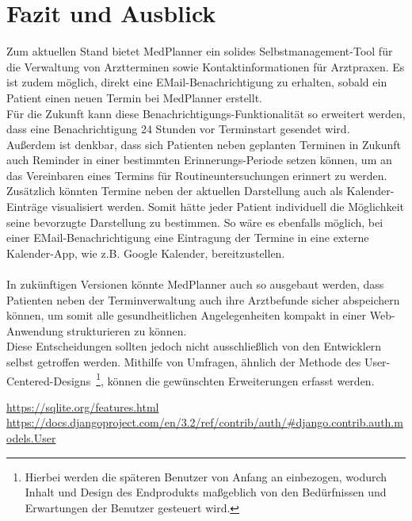 \documentclass[conference]{IEEEtran}
\begin{document}
\section{Fazit und Ausblick}
Zum aktuellen Stand bietet MedPlanner ein solides Selbstmanagement-Tool für die Verwaltung von Arztterminen sowie Kontaktinformationen für Arztpraxen. Es ist zudem möglich, direkt eine EMail-Benachrichtigung zu erhalten, sobald ein Patient einen neuen Termin bei MedPlanner erstellt.\\
Für die Zukunft kann diese Benachrichtigungs-Funktionalität so erweitert werden, dass eine Benachrichtigung 24 Stunden vor Terminstart gesendet wird.\\
Außerdem ist denkbar, dass sich Patienten neben geplanten Terminen in Zukunft auch Reminder in einer bestimmten Erinnerungs-Periode setzen können, um an das Vereinbaren eines Termins für Routineuntersuchungen erinnert zu werden.\\
Zusätzlich könnten Termine neben der aktuellen Darstellung auch als Kalender-Einträge visualisiert werden. Somit hätte jeder Patient individuell die Möglichkeit seine bevorzugte Darstellung zu bestimmen.
So wäre es ebenfalls möglich, bei einer EMail-Benachrichtigung eine Eintragung der Termine in eine externe Kalender-App, wie z.B. Google Kalender, bereitzustellen.\\\\
In zukünftigen Versionen könnte MedPlanner auch so ausgebaut werden, dass Patienten neben der Terminverwaltung auch ihre Arztbefunde sicher abspeichern können, um somit alle gesundheitlichen Angelegenheiten kompakt in einer Web-Anwendung strukturieren zu können.\\
Diese Entscheidungen sollten jedoch nicht ausschließlich von den Entwicklern selbst getroffen werden. Mithilfe von Umfragen, ähnlich der Methode des User-Centered-Designs~\footnote{Hierbei werden die späteren Benutzer von Anfang an einbezogen, wodurch Inhalt und Design des Endprodukts maßgeblich von den Bedürfnissen und Erwartungen der Benutzer gesteuert wird.}, können die gewünschten Erweiterungen erfasst werden.

\begin{thebibliography}{00}
 \url{https://sqlite.org/features.html}
 \url{https://docs.djangoproject.com/en/3.2/ref/contrib/auth/#django.contrib.auth.models.User}
\end{thebibliography}
\end{document}
